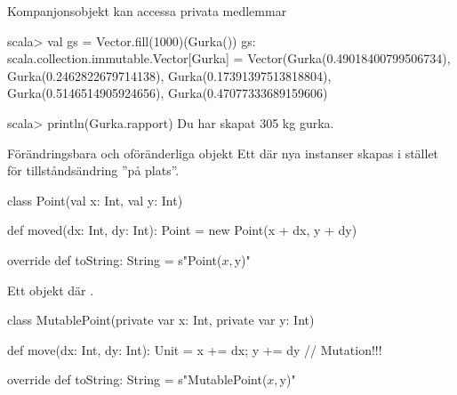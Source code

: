 \begin{Slide}{Kompanjonsobjekt kan accessa privata medlemmar}%
{}

\begin{REPL}
scala> val gs = Vector.fill(1000)(Gurka())
gs: scala.collection.immutable.Vector[Gurka] = 
  Vector(Gurka(0.49018400799506734), Gurka(0.2462822679714138), Gurka(0.17391397513818804), Gurka(0.5146514905924656), Gurka(0.47077333689159606)

scala> println(Gurka.rapport)
Du har skapat 305 kg gurka.

\end{REPL}

\end{Slide}






\begin{Slide}{Förändringsbara och oföränderliga objekt}
Ett  där nya instanser skapas i stället för tillståndsändring ''på plats''.
\begin{Code}
class Point(val x: Int, val y: Int) {
  def moved(dx: Int, dy: Int): Point = new Point(x + dx, y + dy)

  override def toString: String = s"Point($x, $y)"
}
\end{Code}

Ett  objekt där .
\begin{Code}
class MutablePoint(private var x: Int, private var y: Int) {
  def move(dx: Int, dy: Int): Unit = {x += dx; y += dy}  // Mutation!!!

  override def toString: String = s"MutablePoint($x, $y)"
}
\end{Code}
\end{Slide}


